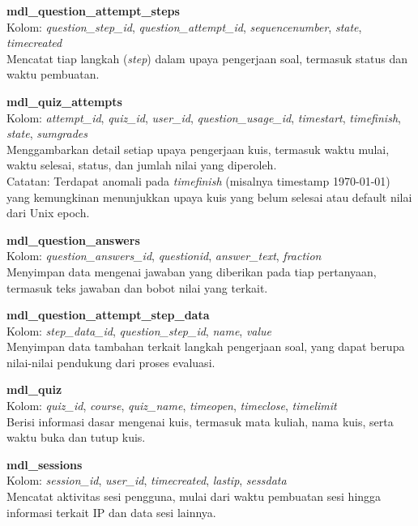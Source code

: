 \textbf{mdl\_question\_attempt\_steps} \\
Kolom: \textit{question\_step\_id}, \textit{question\_attempt\_id}, \textit{sequencenumber}, \textit{state}, \textit{timecreated} \\
Mencatat tiap langkah (\textit{step}) dalam upaya pengerjaan soal, termasuk status dan waktu pembuatan.

\textbf{mdl\_quiz\_attempts} \\
Kolom: \textit{attempt\_id}, \textit{quiz\_id}, \textit{user\_id}, \textit{question\_usage\_id}, \textit{timestart}, \textit{timefinish}, \textit{state}, \textit{sumgrades} \\
Menggambarkan detail setiap upaya pengerjaan kuis, termasuk waktu mulai, waktu selesai, status, dan jumlah nilai yang diperoleh. \\
Catatan: Terdapat anomali pada \textit{timefinish} (misalnya timestamp 1970-01-01) yang kemungkinan menunjukkan upaya kuis yang belum selesai atau default nilai dari Unix epoch.

\textbf{mdl\_question\_answers} \\
Kolom: \textit{question\_answers\_id}, \textit{questionid}, \textit{answer\_text}, \textit{fraction} \\
Menyimpan data mengenai jawaban yang diberikan pada tiap pertanyaan, termasuk teks jawaban dan bobot nilai yang terkait.

\textbf{mdl\_question\_attempt\_step\_data} \\
Kolom: \textit{step\_data\_id}, \textit{question\_step\_id}, \textit{name}, \textit{value} \\
Menyimpan data tambahan terkait langkah pengerjaan soal, yang dapat berupa nilai-nilai pendukung dari proses evaluasi.

\textbf{mdl\_quiz} \\
Kolom: \textit{quiz\_id}, \textit{course}, \textit{quiz\_name}, \textit{timeopen}, \textit{timeclose}, \textit{timelimit} \\
Berisi informasi dasar mengenai kuis, termasuk mata kuliah, nama kuis, serta waktu buka dan tutup kuis.

\textbf{mdl\_sessions} \\
Kolom: \textit{session\_id}, \textit{user\_id}, \textit{timecreated}, \textit{lastip}, \textit{sessdata} \\
Mencatat aktivitas sesi pengguna, mulai dari waktu pembuatan sesi hingga informasi terkait IP dan data sesi lainnya.

